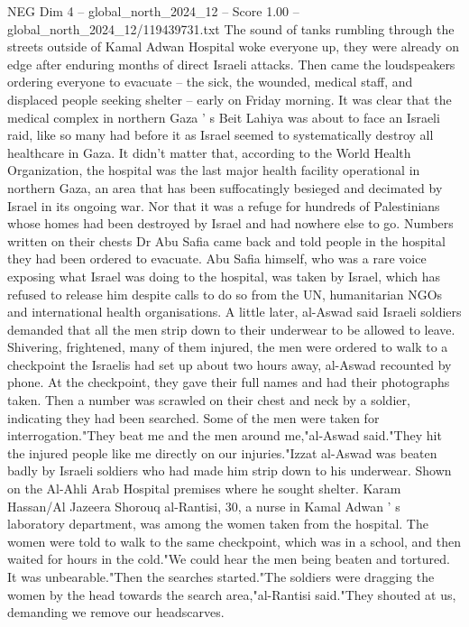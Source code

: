 \begin{textsample}{NEG Dim 4 – global\_north\_2024\_12 – Score 1.00 – global\_north\_2024\_12/119439731.txt}  \label{ex:f4_neg_157}
The sound of tanks rumbling through the streets outside of Kamal Adwan Hospital woke everyone up, they were already on edge after enduring months of direct Israeli attacks.
Then came the loudspeakers ordering everyone to evacuate -- the sick, the wounded, medical staff, and displaced people seeking shelter -- early on Friday morning.
It was clear that the medical complex in northern Gaza ' s Beit Lahiya was about to face an Israeli raid, like so many had before it as Israel seemed to systematically destroy all healthcare in Gaza.
It didn't matter that, according to the World Health Organization, the hospital was the last major health facility operational in northern Gaza, an area that has been suffocatingly besieged and decimated by Israel in its ongoing war.
Nor that it was a refuge for hundreds of Palestinians whose homes had been destroyed by Israel and had nowhere else to go.
Numbers written on their chests Dr Abu Safia came back and told people in the hospital they had been ordered to evacuate.
Abu Safia himself, who was a rare voice exposing what Israel was doing to the hospital, was taken by Israel, which has refused to release him despite calls to do so from the UN, humanitarian NGOs and international health organisations.
A little later, al-Aswad said Israeli soldiers demanded that all the men strip down to their underwear to be allowed to leave.
Shivering, frightened, many of them injured, the men were ordered to walk to a checkpoint the Israelis had set up about two hours away, al-Aswad recounted by phone.
At the checkpoint, they gave their full names and had their photographs taken.
Then a number was scrawled on their chest and neck by a soldier, indicating they had been searched.
Some of the men were taken for interrogation."They beat me and the men around me,"al-Aswad said."They hit the injured people like me directly on our injuries."Izzat al-Aswad was beaten badly by Israeli soldiers who had made him strip down to his underwear.
Shown on the Al-Ahli Arab Hospital premises where he sought shelter.
Karam Hassan/Al Jazeera Shorouq al-Rantisi, 30, a nurse in Kamal Adwan ' s laboratory department, was among the women taken from the hospital.
The women were told to walk to the same checkpoint, which was in a school, and then waited for hours in the cold."We could hear the men being beaten and tortured.
It was unbearable."Then the searches started."The soldiers were dragging the women by the head towards the search area,"al-Rantisi said."They shouted at us, demanding we remove our headscarves.

\end{textsample}
